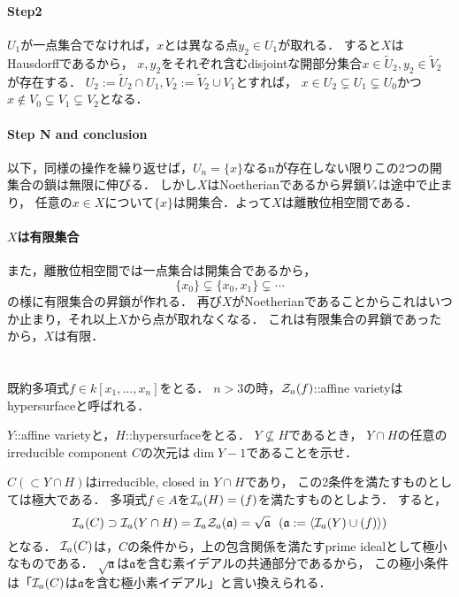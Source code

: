 \documentclass[a4paper]{jarticle}
\newcommand{\I}[1]{\mathfrak{#1}}
\begin{document}
    \paragraph{Step2}
    $U_1$が一点集合でなければ，$x$とは異なる点$y_2 \in U_1$が取れる．
    すると$X$はHausdorffであるから，
    $x, y_2$をそれぞれ含むdisjointな開部分集合$x \in \tilde{U}_2, y_2 \in \tilde{V}_2$が存在する．
    $U_2:=\tilde{U}_2 \cap U_1, V_2:=\tilde{V}_2 \cup V_1$とすれば，
    $x \in U_2 \subsetneq U_1 \subsetneq U_0$かつ$x \not \in V_0 \subsetneq V_1 \subsetneq V_2$となる．

    \paragraph{Step N and conclusion}
    以下，同様の操作を繰り返せば，$U_n=\{x\}$なるnが存在しない限りこの2つの開集合の鎖は無限に伸びる．
    しかし$X$はNoetherianであるから昇鎖$V_{\ast}$は途中で止まり，
    任意の$x \in X$について$\{x\}$は開集合．よって$X$は離散位相空間である．

    \paragraph{$X$は有限集合}
    また，離散位相空間では一点集合は開集合であるから，
    \[ \{x_0\} \subsetneq \{x_0, x_1\} \subsetneq \cdots \]
    の様に有限集合の昇鎖が作れる．
    再び$X$がNoetherianであることからこれはいつか止まり，それ以上$X$から点が取れなくなる．
    これは有限集合の昇鎖であったから，$X$は有限．

\section{}
    既約多項式$f \in k[x_1, \dots, x_n]$をとる．
    $n>3$の時，$\mathcal{Z}_a(f)$::affine varietyはhypersurfaceと呼ばれる．
    \begin{screen}
        $Y$::affine varietyと，$H$::hypersurfaceをとる．
        $Y \not \subseteq H$であるとき，
        $Y \cap H$の任意のirreducible component $C$の次元は$\dim Y-1$であることを示せ．
    \end{screen}
    $C (\subset Y \cap H)$はirreducible, closed in $Y \cap H$であり，
    この2条件を満たすものとしては極大である．
    多項式$f \in A$を$\mathcal{I}_a(H)=(f)$を満たすものとしよう．
    すると，
    \[
        \defsa(C) \supset \defsa(Y \cap H)=\defsa \zerosa (\I{a})=\sqrt{\I{a}}
        ~~ (\I{a}:=\langle \defsa(Y) \cup (f)\rangle)
    \]
    となる．
    $\mathcal{I}_a(C)$は，$C$の条件から，上の包含関係を満たすprime idealとして極小なものである．
    $\sqrt{\I{a}}$は$\I{a}$を含む素イデアルの共通部分であるから，
    この極小条件は「$\mathcal{I}_a(C)$は$\I{a}$を含む極小素イデアル」と言い換えられる．
\end{document}
